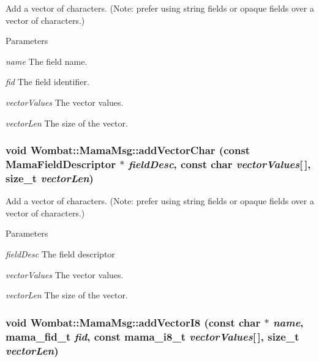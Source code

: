 Add a vector of characters. (Note: prefer using string fields or opaque fields over a vector of characters.) 
\begin{DoxyParams}{Parameters}
\item[{\em name}]The field name. \item[{\em fid}]The field identifier. \item[{\em vectorValues}]The vector values. \item[{\em vectorLen}]The size of the vector. \end{DoxyParams}
\hypertarget{classWombat_1_1MamaMsg_aca6dadc3a488025091d7569355dd55b1}{
\subsubsection[{addVectorChar}]{\setlength{\rightskip}{0pt plus 5cm}void Wombat::MamaMsg::addVectorChar (const {\bf MamaFieldDescriptor} $\ast$ {\em fieldDesc}, \/  const char {\em vectorValues}\mbox{[}$\,$\mbox{]}, \/  size\_\-t {\em vectorLen})}}
\label{classWombat_1_1MamaMsg_aca6dadc3a488025091d7569355dd55b1}


Add a vector of characters. (Note: prefer using string fields or opaque fields over a vector of characters.) 
\begin{DoxyParams}{Parameters}
\item[{\em fieldDesc}]The field descriptor \item[{\em vectorValues}]The vector values. \item[{\em vectorLen}]The size of the vector. \end{DoxyParams}
\hypertarget{classWombat_1_1MamaMsg_ab54e7454c9788dec664ee689d166e234}{
\subsubsection[{addVectorI8}]{\setlength{\rightskip}{0pt plus 5cm}void Wombat::MamaMsg::addVectorI8 (const char $\ast$ {\em name}, \/  mama\_\-fid\_\-t {\em fid}, \/  const mama\_\-i8\_\-t {\em vectorValues}\mbox{[}$\,$\mbox{]}, \/  size\_\-t {\em vectorLen})}}
\label{classWombat_1_1MamaMsg_ab54e7454c9788dec664ee689d166e234}


